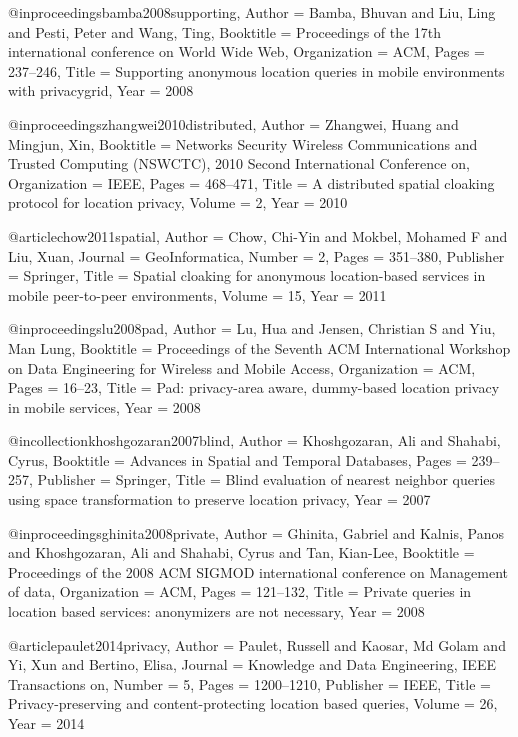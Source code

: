 {{{{{{{{{@inproceedings{bamba2008supporting,
	Author = {Bamba, Bhuvan and Liu, Ling and Pesti, Peter and Wang, Ting},
	Booktitle = {Proceedings of the 17th international conference on World Wide Web},
	Organization = {ACM},
	Pages = {237--246},
	Title = {Supporting anonymous location queries in mobile environments with privacygrid},
	Year = {2008}}

@inproceedings{zhangwei2010distributed,
	Author = {Zhangwei, Huang and Mingjun, Xin},
	Booktitle = {Networks Security Wireless Communications and Trusted Computing (NSWCTC), 2010 Second International Conference on},
	Organization = {IEEE},
	Pages = {468--471},
	Title = {A distributed spatial cloaking protocol for location privacy},
	Volume = {2},
	Year = {2010}}

@article{chow2011spatial,
	Author = {Chow, Chi-Yin and Mokbel, Mohamed F and Liu, Xuan},
	Journal = {GeoInformatica},
	Number = {2},
	Pages = {351--380},
	Publisher = {Springer},
	Title = {Spatial cloaking for anonymous location-based services in mobile peer-to-peer environments},
	Volume = {15},
	Year = {2011}}

@inproceedings{lu2008pad,
	Author = {Lu, Hua and Jensen, Christian S and Yiu, Man Lung},
	Booktitle = {Proceedings of the Seventh ACM International Workshop on Data Engineering for Wireless and Mobile Access},
	Organization = {ACM},
	Pages = {16--23},
	Title = {Pad: privacy-area aware, dummy-based location privacy in mobile services},
	Year = {2008}}

@incollection{khoshgozaran2007blind,
	Author = {Khoshgozaran, Ali and Shahabi, Cyrus},
	Booktitle = {Advances in Spatial and Temporal Databases},
	Pages = {239--257},
	Publisher = {Springer},
	Title = {Blind evaluation of nearest neighbor queries using space transformation to preserve location privacy},
	Year = {2007}}

@inproceedings{ghinita2008private,
	Author = {Ghinita, Gabriel and Kalnis, Panos and Khoshgozaran, Ali and Shahabi, Cyrus and Tan, Kian-Lee},
	Booktitle = {Proceedings of the 2008 ACM SIGMOD international conference on Management of data},
	Organization = {ACM},
	Pages = {121--132},
	Title = {Private queries in location based services: anonymizers are not necessary},
	Year = {2008}}

@article{paulet2014privacy,
	Author = {Paulet, Russell and Kaosar, Md Golam and Yi, Xun and Bertino, Elisa},
	Journal = {Knowledge and Data Engineering, IEEE Transactions on},
	Number = {5},
	Pages = {1200--1210},
	Publisher = {IEEE},
	Title = {Privacy-preserving and content-protecting location based queries},
	Volume = {26},
	Year = {2014}}

}}}}}}}}}
